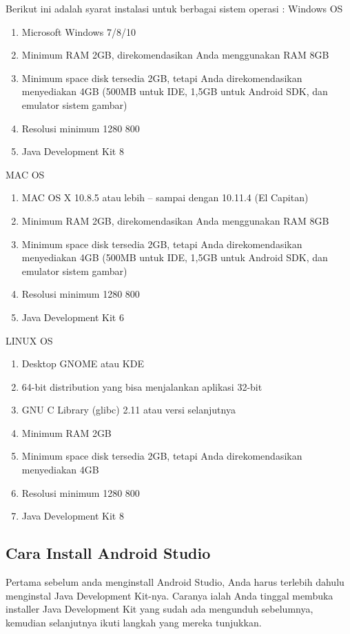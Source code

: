 Berikut ini adalah syarat instalasi untuk berbagai sistem operasi :
Windows OS
\begin{enumerate}
    \item Microsoft Windows 7/8/10
    \item Minimum RAM 2GB, direkomendasikan Anda menggunakan RAM 8GB
    \item Minimum space disk tersedia 2GB, tetapi Anda direkomendasikan menyediakan 4GB (500MB untuk IDE, 1,5GB untuk Android SDK, dan emulator sistem gambar)
    \item Resolusi minimum 1280  800
    \item Java Development Kit 8
\end{enumerate}

MAC OS
\begin{enumerate}
    \item MAC OS X 10.8.5 atau lebih – sampai dengan 10.11.4 (El Capitan)
    \item Minimum RAM 2GB, direkomendasikan Anda menggunakan RAM 8GB
    \item Minimum space disk tersedia 2GB, tetapi Anda direkomendasikan menyediakan 4GB (500MB untuk IDE, 1,5GB untuk Android SDK, dan emulator sistem gambar)
    \item Resolusi minimum 1280  800
    \item Java Development Kit 6
 \end{enumerate}

LINUX OS
\begin{enumerate}
    \item Desktop GNOME atau KDE
    \item 64-bit distribution yang bisa menjalankan aplikasi 32-bit
    \item GNU C Library (glibc) 2.11 atau versi selanjutnya
    \item Minimum RAM 2GB
    \item Minimum space disk tersedia 2GB, tetapi Anda direkomendasikan menyediakan 4GB
    \item Resolusi minimum 1280  800
    \item Java Development Kit 8
\end{enumerate}


\subsection{Cara Install Android Studio}
Pertama sebelum anda menginstall Android Studio, Anda harus terlebih dahulu menginstal Java Development Kit-nya. Caranya ialah Anda tinggal membuka installer Java Development Kit yang sudah ada mengunduh sebelumnya, kemudian selanjutnya ikuti langkah yang mereka tunjukkan.

